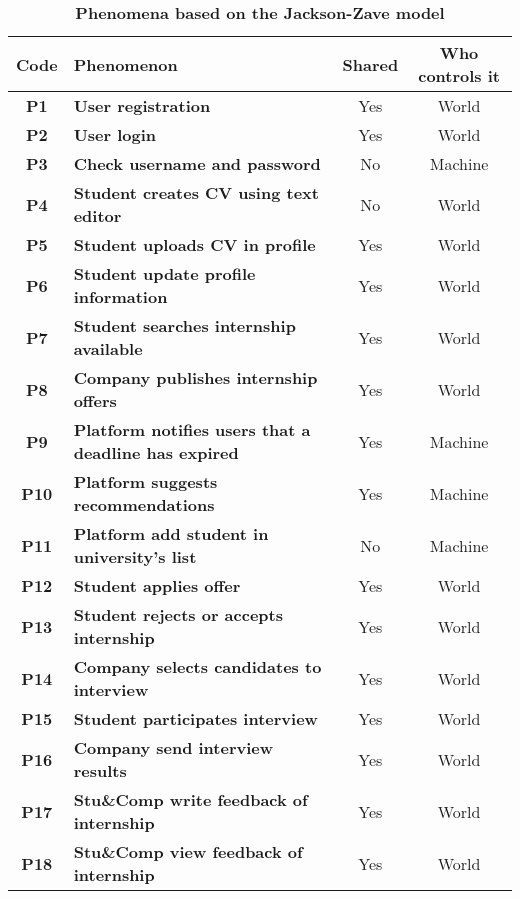 \begin{table}[H]
    \caption*{\textbf{Phenomena based on the Jackson-Zave model}}
    \centering 
    \begin{tabular}{|c|p{20em}|c|c|}
    \hline
    \rowcolor{bluepoli!40} %
    \textbf{Code} & \textbf{Phenomenon} & \textbf{Shared} & \textbf{Who controls it} \T\B \\
    \hline
    \textbf{P1} & \textbf{User registration} & Yes & World \T\B \\
    \textbf{P2} & \textbf{User login} & Yes & World \T\B\\
    \textbf{P3} & \textbf{Check username and password} & No & Machine \T\B\\
    \textbf{P4} & \textbf{Student creates CV using text editor} & No & World  \T\B \\
    \textbf{P5} & \textbf{Student uploads CV in profile} & Yes & World  \T\B \\
    \textbf{P6} & \textbf{Student update profile information} & Yes & World  \T\B \\
    \textbf{P7} & \textbf{Student searches internship available} & Yes & World \T\B\\
    \textbf{P8} & \textbf{Company publishes internship offers} & Yes & World \T\B \\
    \textbf{P9} & \textbf{Platform notifies users that a deadline has expired} & Yes & Machine \B\\
    \textbf{P10} & \textbf{Platform suggests recommendations} & Yes & Machine \T\B \\
    \textbf{P11} & \textbf{Platform add student in university's list} & No & Machine \T\B \\
    \textbf{P12} & \textbf{Student applies offer} & Yes & World \B\\
    \textbf{P13} & \textbf{Student rejects or accepts internship} & Yes & World \T\B \\
    \textbf{P14} & \textbf{Company selects candidates to interview} & Yes & World \T\B\\
    \textbf{P15} & \textbf{Student participates interview} & Yes & World \T\B \\
    \textbf{P16} & \textbf{Company send interview results} & Yes & World \B\\
    \textbf{P17} & \textbf{Stu\&Comp write feedback of internship} & Yes & World \T\B\\
    \textbf{P18} & \textbf{Stu\&Comp view feedback of internship} & Yes & World \B\\

\end{tabular}
\end{table}
